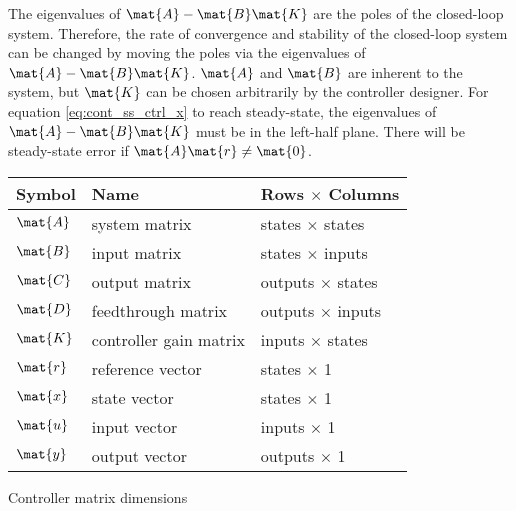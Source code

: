 The eigenvalues of $\mat{A} - \mat{B}\mat{K}$ are the poles of the closed-loop
\gls{system}. Therefore, the rate of convergence and stability of the
closed-loop \gls{system} can be changed by moving the poles via the eigenvalues
of $\mat{A} - \mat{B}\mat{K}$. $\mat{A}$ and $\mat{B}$ are inherent to the
\gls{system}, but $\mat{K}$ can be chosen arbitrarily by the controller
designer. For equation \eqref{eq:cont_ss_ctrl_x} to reach steady-state, the
eigenvalues of $\mat{A} - \mat{B}\mat{K}$ must be in the left-half plane.
There will be steady-state error if $\mat{A}\mat{r} \ne \mat{0}$.
\begin{booktable}
  \begin{tabular}{|lll|}
    \hline
    \rowcolor{headingbg}
    \textbf{Symbol} & \textbf{Name} & \textbf{Rows $\times$ Columns} \\
    \hline
    $\mat{A}$ & system matrix & states $\times$ states \\
    $\mat{B}$ & input matrix & states $\times$ inputs \\
    $\mat{C}$ & output matrix & outputs $\times$ states \\
    $\mat{D}$ & feedthrough matrix & outputs $\times$ inputs \\
    $\mat{K}$ & controller gain matrix & inputs $\times$ states \\
    $\mat{r}$ & \gls{reference} vector & states $\times$ 1 \\
    $\mat{x}$ & state vector & states $\times$ 1 \\
    $\mat{u}$ & input vector & inputs $\times$ 1 \\
    $\mat{y}$ & output vector & outputs $\times$ 1 \\
    \hline
  \end{tabular}
  \caption{Controller matrix dimensions}
\end{booktable}
